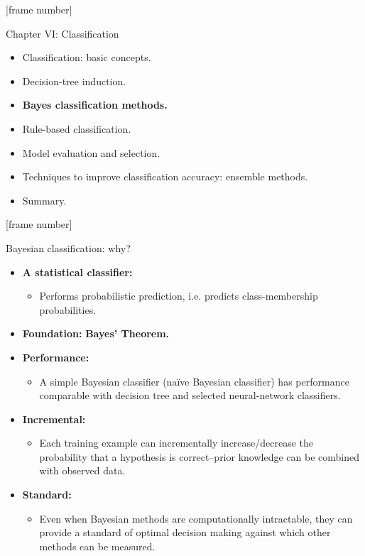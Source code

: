 \documentclass[aspectratio=169,t,table]{beamer}
\begin{document}
  {
    [frame number]
    \begin{frame}{Chapter VI: Classification}
        \begin{itemize}
            \item Classification: basic concepts.
            \item Decision-tree induction.
            \item \textbf{Bayes classification methods.}
            \item Rule-based classification.
            \item Model evaluation and selection.
            \item Techniques to improve classification accuracy: ensemble methods.
            \item Summary.
        \end{itemize}
    \end{frame}
  }

  {
    [frame number]
    \begin{frame}{Bayesian classification: why?}
        \begin{itemize}
            \item \textbf{A statistical classifier:}
            \begin{itemize}
              \item Performs probabilistic prediction, i.e. predicts class-membership probabilities.
            \end{itemize}
            \item \textbf{Foundation:} \textbf{\color{airforceblue}Bayes' Theorem.}
            \item \textbf{Performance:}
            \begin{itemize}
              \item A simple Bayesian classifier (naïve Bayesian classifier) has performance comparable with decision tree and selected neural-network classifiers.
            \end{itemize}
            \item \textbf{Incremental:}
            \begin{itemize}
              \item Each training example can incrementally increase/decrease the probability that a hypothesis is correct--prior knowledge can be combined with observed data.
            \end{itemize}
            \item \textbf{Standard:}
            \begin{itemize}
              \item Even when Bayesian methods are computationally intractable, they can provide a standard of optimal decision making against which other methods can be measured.
            \end{itemize}
        \end{itemize}
    \end{frame}
  }
\end{document}

